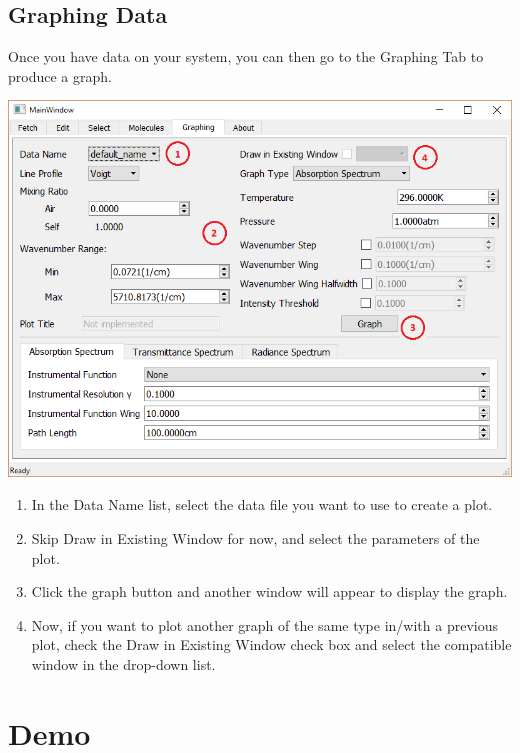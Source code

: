 \documentclass[12pt]{article}
\begin{document}
\subsection{Graphing Data}
Once you have data on your system, you can then go to the Graphing Tab to produce a graph. 
\begin{center}
\includegraphics[scale = 0.5]{MainWindow_GraphingGuide}
\end{center}
\begin{enumerate}
\item In the Data Name list, select the data file you want to use to create a plot.
\item Skip Draw in Existing Window for now, and select the parameters of the plot.
\item Click the graph button and another window will appear to display the graph.
\item Now, if you want to plot another graph of the same type in/with a previous plot, check the Draw in Existing Window check box and select the compatible window in the drop-down list.
\end{enumerate}


\section{Demo}
\end{document}
